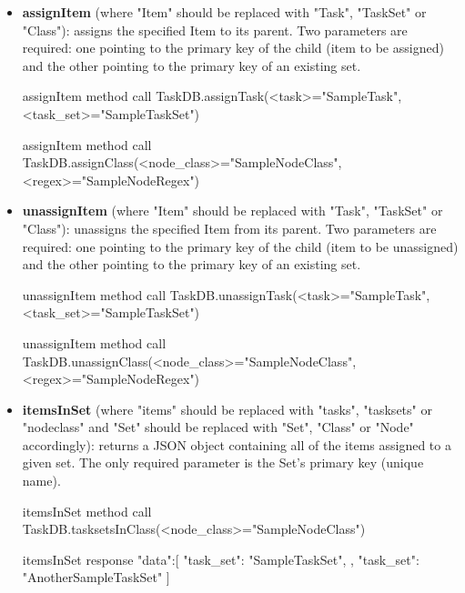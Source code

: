 \begin{itemize}
    \item 
        \textbf{assignItem} (where "Item" should be replaced with "Task", "TaskSet" or "Class"): assigns the specified Item to its parent. Two parameters are required: one pointing to the primary key of the child (item to be assigned) and the other pointing to the primary key of an existing set.
        \begin{sexylisting}[colback=white]{assignItem method call}
TaskDB.assignTask(<task>="SampleTask", 
                  <task_set>="SampleTaskSet")
        \end{sexylisting}
        \begin{sexylisting}[colback=white]{assignItem method call}
TaskDB.assignClass(<node_class>="SampleNodeClass", 
                   <regex>="SampleNodeRegex")
        \end{sexylisting}
        
    \item 
        \textbf{unassignItem} (where "Item" should be replaced with "Task", "TaskSet" or "Class"): unassigns the specified Item from its parent. Two parameters are required: one pointing to the primary key of the child (item to be unassigned) and the other pointing to the primary key of an existing set.
        \begin{sexylisting}[colback=white]{unassignItem method call}
TaskDB.unassignTask(<task>="SampleTask", 
                    <task_set>="SampleTaskSet")
        \end{sexylisting}
        \begin{sexylisting}[colback=white]{unassignItem method call}
TaskDB.unassignClass(<node_class>="SampleNodeClass", 
                     <regex>="SampleNodeRegex")
        \end{sexylisting}
      
\newpage  
    \item
        \textbf{itemsInSet} (where "items" should be replaced with "tasks", "tasksets" or "nodeclass" and "Set" should be replaced with "Set", "Class" or "Node" accordingly): returns a JSON object containing all of the items assigned to a given set. The only required parameter is the Set's primary key (unique name).
        \begin{sexylisting}[colback=white]{itemsInSet method call}
TaskDB.tasksetsInClass(<node_class>="SampleNodeClass")
        \end{sexylisting}
        \begin{sexylisting}[colback=white]{itemsInSet response}
{"data":[
    {
        "task_set": "SampleTaskSet",
    },
    {
        "task_set": "AnotherSampleTaskSet"
    }
]}
        \end{sexylisting}
        

\end{itemize}
